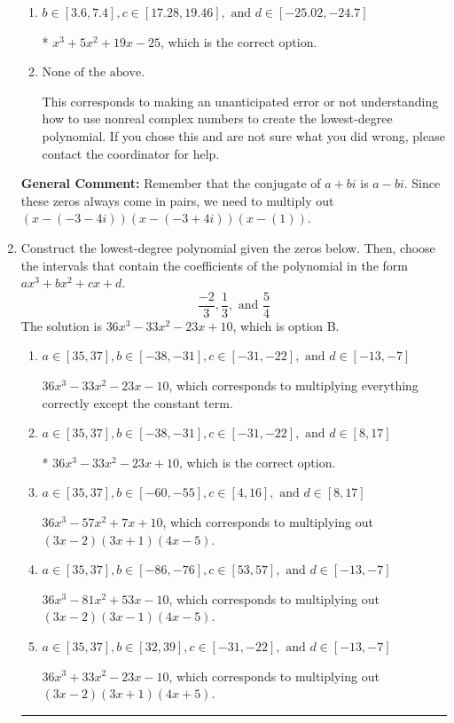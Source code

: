\documentclass{extbook}[14pt]
\newcommand{\litem}[1]{\item #1

\rule{\textwidth}{0.4pt}}
\begin{document}
\begin{enumerate}
{\begin{enumerate}[label=\Alph*.]
$x^{3} + x^{2} +3 x -4$, which corresponds to multiplying out $(x + 4)(x -1)$.
\item \( b \in [3.6, 7.4], c \in [17.28, 19.46], \text{ and } d \in [-25.02, -24.7] \)

* $x^{3} +5 x^{2} +19 x -25$, which is the correct option.
\item \( \text{None of the above.} \)

This corresponds to making an unanticipated error or not understanding how to use nonreal complex numbers to create the lowest-degree polynomial. If you chose this and are not sure what you did wrong, please contact the coordinator for help.
\end{enumerate}

\textbf{General Comment:} Remember that the conjugate of $a+bi$ is $a-bi$. Since these zeros always come in pairs, we need to multiply out $(x-(-3 - 4 i))(x-(-3 + 4 i))(x-(1))$.
}
\litem{
Construct the lowest-degree polynomial given the zeros below. Then, choose the intervals that contain the coefficients of the polynomial in the form $ax^3+bx^2+cx+d$.
\[ \frac{-2}{3}, \frac{1}{3}, \text{ and } \frac{5}{4} \]The solution is \( 36x^{3} -33 x^{2} -23 x + 10 \), which is option B.\begin{enumerate}[label=\Alph*.]
\item \( a \in [35, 37], b \in [-38, -31], c \in [-31, -22], \text{ and } d \in [-13, -7] \)

$36x^{3} -33 x^{2} -23 x -10$, which corresponds to multiplying everything correctly except the constant term.
\item \( a \in [35, 37], b \in [-38, -31], c \in [-31, -22], \text{ and } d \in [8, 17] \)

* $36x^{3} -33 x^{2} -23 x + 10$, which is the correct option.
\item \( a \in [35, 37], b \in [-60, -55], c \in [4, 16], \text{ and } d \in [8, 17] \)

$36x^{3} -57 x^{2} +7 x + 10$, which corresponds to multiplying out $(3x -2)(3x + 1)(4x -5)$.
\item \( a \in [35, 37], b \in [-86, -76], c \in [53, 57], \text{ and } d \in [-13, -7] \)

$36x^{3} -81 x^{2} +53 x -10$, which corresponds to multiplying out $(3x -2)(3x -1)(4x -5)$.
\item \( a \in [35, 37], b \in [32, 39], c \in [-31, -22], \text{ and } d \in [-13, -7] \)

$36x^{3} +33 x^{2} -23 x -10$, which corresponds to multiplying out $(3x -2)(3x + 1)(4x + 5)$.
\end{enumerate}

}
\end{enumerate}
\end{document}
